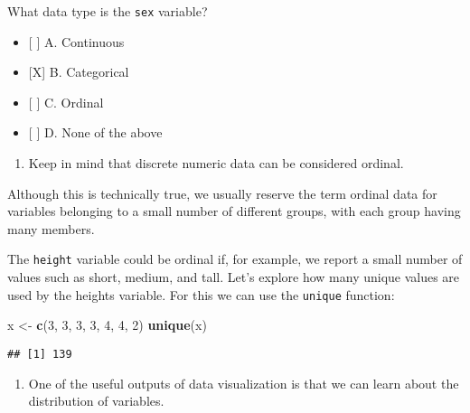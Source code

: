 \documentclass[]{article}
\newenvironment{Shaded}{\begin{snugshade}}{\end{snugshade}}
\newcommand{\DecValTok}[1]{\textcolor[rgb]{0.00,0.00,0.81}{#1}}
\newcommand{\KeywordTok}[1]{\textcolor[rgb]{0.13,0.29,0.53}{\textbf{#1}}}
\newcommand{\NormalTok}[1]{#1}
\newcommand{\OperatorTok}[1]{\textcolor[rgb]{0.81,0.36,0.00}{\textbf{#1}}}
\newcommand{\StringTok}[1]{\textcolor[rgb]{0.31,0.60,0.02}{#1}}
\providecommand{\tightlist}{%
  \setlength{\itemsep}{0pt}\setlength{\parskip}{0pt}}
\begin{document}
What data type is the \texttt{sex} variable?

\begin{itemize}
\tightlist
\item
  {[} {]} A. Continuous
\item
  {[}X{]} B. Categorical
\item
  {[} {]} C. Ordinal
\item
  {[} {]} D. None of the above
\end{itemize}

\begin{enumerate}
\def\labelenumi{\arabic{enumi}.}
\setcounter{enumi}{2}
\tightlist
\item
  Keep in mind that discrete numeric data can be considered ordinal.
\end{enumerate}

Although this is technically true, we usually reserve the term ordinal
data for variables belonging to a small number of different groups, with
each group having many members.

The \texttt{height} variable could be ordinal if, for example, we report
a small number of values such as short, medium, and tall. Let's explore
how many unique values are used by the heights variable. For this we can
use the \texttt{unique} function:

\begin{Shaded}
\begin{Highlighting}[]
\NormalTok{x <-}\StringTok{ }\KeywordTok{c}\NormalTok{(}\DecValTok{3}\NormalTok{, }\DecValTok{3}\NormalTok{, }\DecValTok{3}\NormalTok{, }\DecValTok{3}\NormalTok{, }\DecValTok{4}\NormalTok{, }\DecValTok{4}\NormalTok{, }\DecValTok{2}\NormalTok{)}
\KeywordTok{unique}\NormalTok{(x)}
\end{Highlighting}
\end{Shaded}

\begin{Shaded}
\end{Shaded}

\begin{verbatim}
## [1] 139
\end{verbatim}

\begin{enumerate}
\def\labelenumi{\arabic{enumi}.}
\setcounter{enumi}{3}
\tightlist
\item
  One of the useful outputs of data visualization is that we can learn
  about the distribution of variables.
\end{enumerate}
\end{document}
